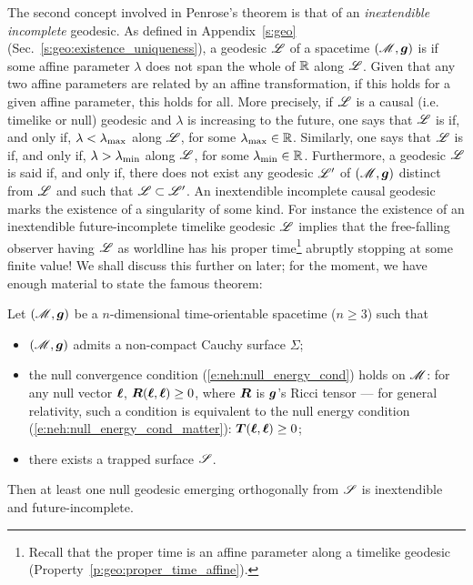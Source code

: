 The second concept involved in Penrose's theorem is that of
an \emph{inextendible incomplete} geodesic. As defined in
Appendix~\ref{s:geo} (Sec.~\ref{s:geo:existence_uniqueness}), a
geodesic $\mathscr{L}$ of a spacetime $(\mathscr{M},\bm{g})$ is  if some affine parameter $\lambda$ does not
span the whole of $\mathbb{R}$ along $\mathscr{L}$.
Given that any two affine parameters are related by
an affine transformation, if this holds for a given affine parameter, this holds for all.
More precisely, if $\mathscr{L}$ is a causal (i.e. timelike or null) geodesic and $\lambda$ is increasing to the future, one says that $\mathscr{L}$
is  if, and only if, $\lambda < \lambda_{\rm max}$
along $\mathscr{L}$, for some $\lambda_{\rm max}\in\mathbb{R}$.
Similarly, one says that $\mathscr{L}$
is  if, and only if,
$\lambda > \lambda_{\rm min}$ along $\mathscr{L}$, for some $\lambda_{\rm min}\in\mathbb{R}$.
Furthermore, a geodesic $\mathscr{L}$ is said  if, and only if,
there does not exist any geodesic $\mathscr{L}'$ of $(\mathscr{M},\bm{g})$ distinct from $\mathscr{L}$
and such that $\mathscr{L}\subset\mathscr{L}'$. An inextendible incomplete causal geodesic
marks the existence of a singularity of some kind. For instance the existence of an
inextendible future-incomplete timelike geodesic $\mathscr{L}$ implies that the free-falling
observer having $\mathscr{L}$ as worldline has his proper time\footnote{Recall that
the proper time is an affine parameter along a timelike geodesic (Property~\ref{p:geo:proper_time_affine}).} abruptly
stopping at some finite value!
We shall discuss this further on later; for the moment, we have enough material
to state the famous theorem:

\begin{prop}
\label{p:loc:Penrose_sing_thm}
Let $(\mathscr{M},\bm{g})$ be a $n$-dimensional time-orientable spacetime ($n\ge 3$) such that
\begin{itemize}
\item $(\mathscr{M},\bm{g})$ admits a non-compact Cauchy surface $\Sigma$;
\item the null convergence condition (\ref{e:neh:null_energy_cond}) holds on $\mathscr{M}$:
for any null vector $\bm{\ell}$, $\bm{R}(\bm{\ell}, \bm{\ell}) \geq 0$, where $\bm{R}$ is
$\bm{g}$'s Ricci tensor --- for general relativity, such a condition is
equivalent to the null energy condition (\ref{e:neh:null_energy_cond_matter}):
$\bm{T}(\bm{\ell}, \bm{\ell}) \geq 0$;
\item there exists a trapped surface $\mathscr{S}$.
\end{itemize}
Then at least one null geodesic emerging orthogonally from $\mathscr{S}$
is inextendible and future-incomplete.
\end{prop}

